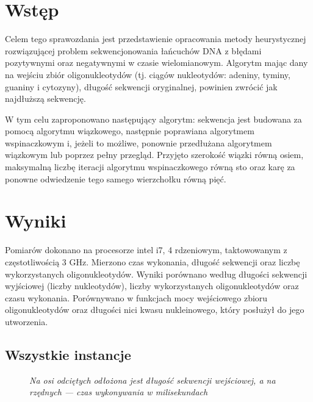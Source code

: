 \documentclass{article}
\begin{document}


\section{Wstęp}
Celem tego sprawozdania jest przedstawienie opracowania metody heurystycznej rozwiązującej problem sekwencjonowania łańcuchów DNA z błędami pozytywnymi oraz negatywnymi w czasie wielomianowym. Algorytm mając dany na wejściu zbiór oligonukleotydów (tj. ciągów nukleotydów: adeniny, tyminy, guaniny i cytozyny), długość sekwencji oryginalnej, powinien zwrócić jak najdłuższą sekwencję.

W tym celu zaproponowano następujący algorytm: sekwencja jest budowana za pomocą algorytmu wiązkowego, następnie poprawiana algorytmem wspinaczkowym i, jeżeli to możliwe, ponownie przedłużana algorytmem wiązkowym lub poprzez pełny przegląd. Przyjęto szerokość wiązki równą osiem, maksymalną liczbę iteracji algorytmu wspinaczkowego  równą sto oraz karę za ponowne odwiedzenie tego samego wierzchołku równą pięć.

\section{Wyniki}

Pomiarów dokonano na procesorze intel i7, 4 rdzeniowym, taktowowanym z częstotliwością 3 GHz.
Mierzono czas wykonania, długość sekwencji oraz liczbę wykorzystanych oligonukleotydów.
Wyniki porównano według długości sekwencji wyjściowej (liczby nukleotydów), liczby wykorzystanych oligonukleotydów oraz czasu wykonania.
Porównywano w funkcjach mocy wejściowego zbioru oligonukleotydów oraz długości nici kwasu nukleinowego, który posłużył do jego utworzenia.


\subsection{Wszystkie instancje}

\begin{figure}[h]
\caption{\textit{Na osi odciętych odłożona jest długość sekwencji wejściowej, a na rzędnych --- czas wykonywania w milisekundach}}
\end{figure}
\end{document}
